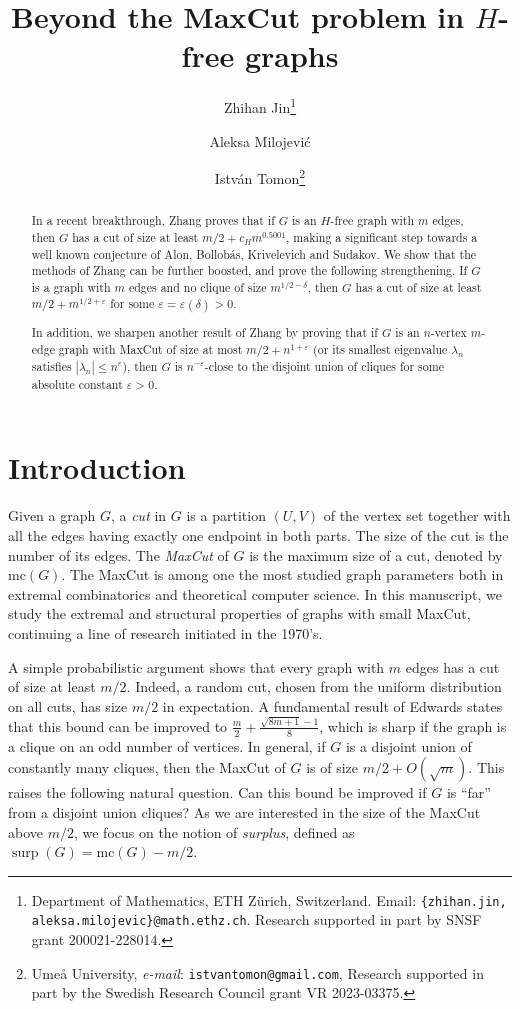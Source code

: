 \documentclass[11pt]{article}
\title{Beyond the MaxCut problem in $H$-free graphs}
\author{Zhihan Jin\thanks{Department of Mathematics, ETH Z\"urich, Switzerland. Email: {\tt \{zhihan.jin, aleksa.milojevic\}@math.ethz.ch}. Research supported in part by SNSF grant 200021-228014.}
\and Aleksa Milojevi\'c\footnotemark[1]
\and 
Istv\'an Tomon\thanks{Ume\r{a} University, \emph{e-mail}: \texttt{istvantomon@gmail.com}, Research supported in part by the Swedish Research Council grant VR 2023-03375.}}
\date{}
\theoremstyle{plain}
\theoremstyle{definition}
\DeclareMathOperator{\surp}{surp}
\newcommand{\eps}{\varepsilon}
\begin{document}
\maketitle

\begin{abstract}
In a recent breakthrough, Zhang proves that if $G$ is an $H$-free graph with $m$ edges, then $G$ has a cut of size at least $m/2+c_Hm^{0.5001}$, making a significant step towards a well known conjecture of Alon, Bollob\'as, Krivelevich and Sudakov. We show that the methods of Zhang can be further boosted, and prove the following strengthening. If $G$ is a graph with $m$ edges and no clique of size $m^{1/2-\delta}$, then $G$ has a cut of size at least $m/2+m^{1/2+\eps}$ for some $\eps=\eps(\delta)>0$.

In addition, we sharpen another result of Zhang by proving that if $G$ is an $n$-vertex $m$-edge graph with MaxCut of size at most $m/2+n^{1+\eps}$ (or its smallest eigenvalue $\lambda_n$ satisfies $|\lambda_n|\leq n^{\eps}$), then $G$ is $n^{-\eps}$-close to the disjoint union of cliques for some absolute constant $\eps>0$.
\end{abstract}

\section{Introduction}

Given a graph $G$, a \emph{cut} in $G$ is a partition $(U,V)$ of the vertex set together with all the edges having exactly one endpoint in both parts. The size of the cut is the number of its edges. The \emph{MaxCut} of $G$ is the maximum size of a cut, denoted by $\mbox{mc}(G)$. The MaxCut is among one the most studied 
graph parameters both in extremal combinatorics and theoretical computer science. In this manuscript, we study the extremal and structural properties of graphs with small MaxCut, continuing a line of research initiated in the 1970's.

A simple probabilistic argument shows that every graph with $m$ edges has a cut of size at least $m/2$. Indeed, a random cut, chosen from the uniform distribution on all cuts, has size $m/2$ in expectation. A fundamental result of Edwards \cite{Edwards1,Edwards2} states that this bound can be improved to $\frac{m}{2}+\frac{\sqrt{8m+1}-1}{8}$, which is sharp if the graph is a clique on an odd number of vertices. In general, if $G$ is a disjoint union of constantly many cliques, then the MaxCut of $G$ is of size $m/2+O(\sqrt{m})$. This raises the following natural question. Can this bound be improved if $G$ is ``far'' from a disjoint union cliques? As we are interested in the size of the MaxCut above $m/2$, we focus on the notion of \emph{surplus}, defined as  $\surp(G)=\mbox{mc}(G)-m/2$.
\end{document}

